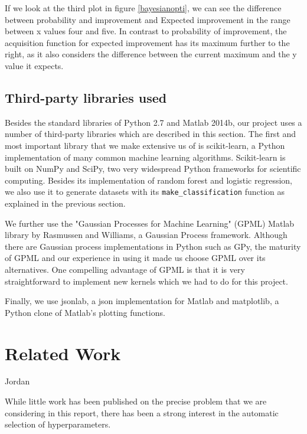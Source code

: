 \documentclass[a4paper,12pt,twoside,openright]{report}
\begin{document}

If we look at the third plot in figure \ref{bayesianopti}, we can see the difference between probability and improvement and Expected improvement in the range between x values four and five. In contrast to probability of improvement, the acquisition function for expected improvement has its maximum further to the right, as it also considers the difference between the current maximum and the y value it expects. 






\section{Third-party libraries used}
Besides the standard libraries of Python 2.7 and Matlab 2014b, our project uses a number of third-party libraries which are described in this section. The first and most important library that we make extensive us of is scikit-learn, a Python implementation of many common machine learning algorithms. Scikit-learn is built on NumPy and SciPy, two very widespread Python frameworks for scientific computing. Besides its implementation of random forest and logistic regression, we also use it to generate datasets with its \texttt{make\_classification} function as explained in the previous section.

We further use the "Gaussian Processes for Machine Learning" (GPML) Matlab library by Rasmussen and Williams, a Gaussian Process framework. Although there are Gaussian process implementations in Python such as GPy, the maturity of GPML and our experience in using it made us choose GPML over its alternatives. One compelling advantage of GPML is that it is very straightforward to implement new kernels which we had to do for this project.

Finally, we use jsonlab, a json implementation for Matlab and matplotlib, a Python clone of Matlab's plotting functions.



\chapter{Related Work}
Jordan \cite{jordan2013}

While little work has been published on the precise problem that we are considering in this report, there has been a strong interest in the automatic selection of hyperparameters.
\end{document}
